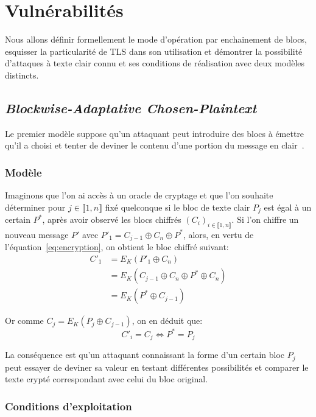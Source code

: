 \documentclass[a4paper,twoside]{article}
\begin{document}
\section{Vulnérabilités}

Nous allons définir formellement le mode d'opération par enchainement de
blocs, esquisser la particularité de TLS dans son utilisation et démontrer
la possibilité d'attaques à texte clair connu et ses conditions de
réalisation avec deux modèles distincts.

\subsection{\emph{Blockwise-Adaptative Chosen-Plaintext}}

Le premier modèle suppose qu'un attaquant peut introduire des blocs à
émettre qu'il a choisi et tenter de deviner le contenu d'une portion du
message en clair~\cite{Bard:2007:BCA}.

\subsubsection{Modèle}

Imaginons que l'on ai accès à un oracle de cryptage et que l'on souhaite
déterminer pour $j\in \llbracket 1, n \rrbracket$ fixé quelconque si le bloc
de texte clair $P_j$ est égal à un certain $P^*$, après avoir observé les
blocs chiffrés ${(C_i)}_{i\in \llbracket 1, n \rrbracket}$. Si l'on chiffre
un nouveau message $P'$ avec $P'_1 = C_{j-1} \oplus C_n \oplus P^*$, alors,
en vertu de l'équation~\ref{eq:encryption}, on obtient le bloc chiffré
suivant:
\begin{align*}
    C'_1    &= E_K (P'_1\oplus C_n)\\
	    &= E_K (C_{j-1} \oplus C_n\oplus P^*\oplus C_n)\\
	    &= E_K (P^*\oplus C_{j-1})
\end{align*}

Or comme $C_j = E_K (P_j\oplus C_{j-1})$, on en déduit que:
\[C'_i = C_j \Leftrightarrow P^* = P_j\]

La conséquence est qu'un attaquant connaissant la forme d'un certain bloc
$P_j$ peut essayer de deviner sa valeur en testant différentes possibilités
et comparer le texte crypté correspondant avec celui du bloc original.

\subsubsection{Conditions d'exploitation}
\end{document}
